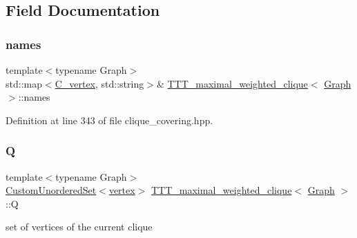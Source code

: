 \subsection{Field Documentation}
\mbox{\label{classTTT__maximal__weighted__clique_ac45f3ecc0934fd36c67c8bccafeff3d0}} 
\subsubsection{\texorpdfstring{names}{names}}
{\footnotesize\ttfamily template$<$typename Graph$>$ \\
std\+::map$<$\hyperlink{clique__covering__graph_8hpp_a9cb45047ea8c5ed95a8cfa90494345aa}{C\+\_\+vertex}, std\+::string$>$\& \hyperlink{classTTT__maximal__weighted__clique}{T\+T\+T\+\_\+maximal\+\_\+weighted\+\_\+clique}$<$ \hyperlink{structGraph}{Graph} $>$\+::names\hspace{0.3cm}{\ttfamily [private]}}



Definition at line 343 of file clique\+\_\+covering.\+hpp.

\mbox{\label{classTTT__maximal__weighted__clique_a0aa8da5eb10ff394b9b3d712cedbc09e}} 
\subsubsection{\texorpdfstring{Q}{Q}}
{\footnotesize\ttfamily template$<$typename Graph$>$ \\
\hyperlink{classCustomUnorderedSet}{Custom\+Unordered\+Set}$<$\hyperlink{classTTT__maximal__weighted__clique_ac6a30ba8fb726c9c83eafe9dc451a799}{vertex}$>$ \hyperlink{classTTT__maximal__weighted__clique}{T\+T\+T\+\_\+maximal\+\_\+weighted\+\_\+clique}$<$ \hyperlink{structGraph}{Graph} $>$\+::Q\hspace{0.3cm}{\ttfamily [private]}}



set of vertices of the current clique 



